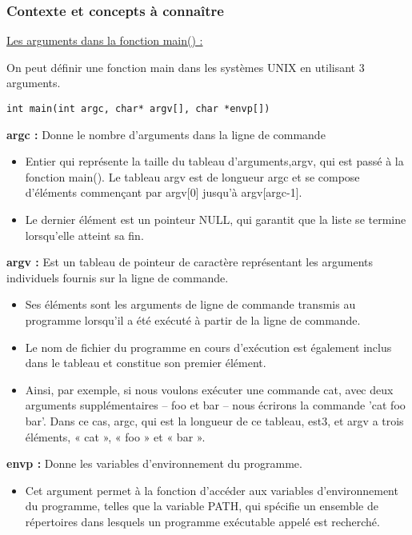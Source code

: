 \documentclass[12pt,a4paper]{article}
\begin{document}
\begin{flushleft}
            \subsubsection{Contexte et concepts à connaître}
            \underline{Les arguments dans la fonction main() : }
                \item On peut définir une fonction main dans les systèmes UNIX en utilisant 3 arguments.
                \begin{lstlisting}
int main(int argc, char* argv[], char *envp[])
                \end{lstlisting}
                \item \textbf{argc : } Donne le nombre d'arguments dans la ligne de commande
                \begin{itemize}
                    \item Entier qui représente la taille du tableau d’arguments,argv, qui est passé à la fonction main(). Le tableau argv est de longueur argc et se compose d’éléments commençant par argv[0] jusqu’à argv[argc-1].
                    \item Le dernier élément est un pointeur NULL, qui garantit que la liste se termine lorsqu’elle atteint sa fin.
                \end{itemize}
                \item \textbf{argv : } Est un tableau de pointeur de caractère représentant les arguments individuels fournis sur la ligne de commande.
                 \begin{itemize}
                    \item Ses éléments sont les arguments de ligne de commande transmis au programme lorsqu’il a été exécuté à partir de la ligne de commande. 
                    \item Le nom de fichier du programme en cours d’exécution est également inclus dans le tableau et constitue son premier élément.
                    \item Ainsi, par exemple, si nous voulons exécuter une commande cat, avec deux arguments supplémentaires – foo et bar – nous écrirons la commande ’cat foo bar'. Dans ce cas, argc, qui est la longueur de ce tableau, est3, et argv a trois éléments, « cat », « foo » et « bar ».
                \end{itemize}
                \item \textbf{envp : } Donne les variables d'environnement du programme. 
                \begin{itemize}
                    \item Cet argument permet à la fonction d’accéder aux variables d’environnement du programme, telles que la variable PATH, qui spécifie un ensemble de répertoires dans lesquels un programme exécutable appelé est recherché.
                \end{itemize}
                

\end{flushleft}
\end{document}
